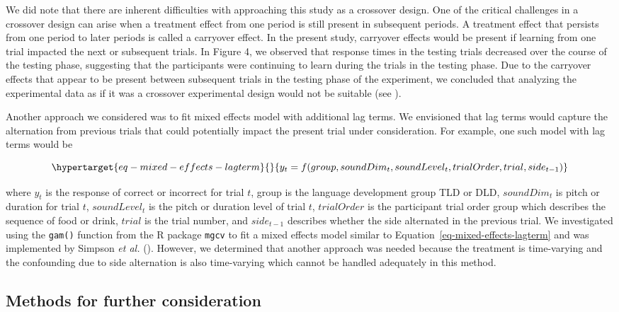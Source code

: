 \documentclass[
  letterpaper,
]{report}
\begin{document}
We did note that there are inherent difficulties with approaching this
study as a crossover design. One of the critical challenges in a
crossover design can arise when a treatment effect from one period is
still present in subsequent periods. A treatment effect that persists
from one period to later periods is called a carryover effect. In the
present study, carryover effects would be present if learning from one
trial impacted the next or subsequent trials. In Figure 4, we observed
that response times in the testing trials decreased over the course of
the testing phase, suggesting that the participants were continuing to
learn during the trials in the testing phase. Due to the carryover
effects that appear to be present between subsequent trials in the
testing phase of the experiment, we concluded that analyzing the
experimental data as if it was a crossover experimental design would not
be suitable (see \textcite{noauthor_lesson_nodate}).

Another approach we considered was to fit mixed effects model with
additional lag terms. We envisioned that lag terms would capture the
alternation from previous trials that could potentially impact the
present trial under consideration. For example, one such model with lag
terms would be

\begin{equation}\protect\hypertarget{eq-mixed-effects-lagterm}{}{
y_t = f(group, soundDim_t, soundLevel_t , trialOrder, trial, side_{t-1})
}\label{eq-mixed-effects-lagterm}\end{equation}

where \(y_t\) is the response of correct or incorrect for trial \(t\),
group is the language development group TLD or DLD, \(soundDim_t\) is
pitch or duration for trial \(t\), \(soundLevel_t\) is the pitch or
duration level of trial \(t\), \(trialOrder\) is the participant trial
order group which describes the sequence of food or drink, \(trial\) is
the trial number, and \(side_{t-1}\) describes whether the side
alternated in the previous trial. We investigated using the
\texttt{gam()} function from the R package \texttt{mgcv} to fit a mixed
effects model similar to Equation~\ref{eq-mixed-effects-lagterm} and was
implemented by Simpson \emph{et al.} (\textcite{simpson_using_2021}).
However, we determined that another approach was needed because the
treatment is time-varying and the confounding due to side alternation is
also time-varying which cannot be handled adequately in this method.

\hypertarget{methods-for-further-consideration}{%
\subsection{Methods for further
consideration}\label{methods-for-further-consideration}}
\end{document}
